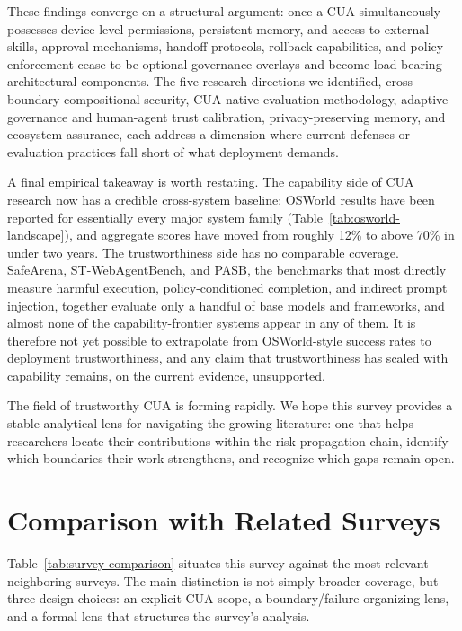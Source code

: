 These findings converge on a structural argument: once a CUA simultaneously possesses device-level permissions, persistent memory, and access to external skills, approval mechanisms, handoff protocols, rollback capabilities, and policy enforcement cease to be optional governance overlays and become load-bearing architectural components. The five research directions we identified, cross-boundary compositional security, CUA-native evaluation methodology, adaptive governance and human-agent trust calibration, privacy-preserving memory, and ecosystem assurance, each address a dimension where current defenses or evaluation practices fall short of what deployment demands.

A final empirical takeaway is worth restating. The capability side of CUA research now has a credible cross-system baseline: OSWorld results have been reported for essentially every major system family (Table~\ref{tab:osworld-landscape}), and aggregate scores have moved from roughly 12\% to above 70\% in under two years. The trustworthiness side has no comparable coverage. SafeArena, ST-WebAgentBench, and PASB, the benchmarks that most directly measure harmful execution, policy-conditioned completion, and indirect prompt injection, together evaluate only a handful of base models and frameworks, and almost none of the capability-frontier systems appear in any of them. It is therefore not yet possible to extrapolate from OSWorld-style success rates to deployment trustworthiness, and any claim that trustworthiness has scaled with capability remains, on the current evidence, unsupported.

The field of trustworthy CUA is forming rapidly. We hope this survey provides a stable analytical lens for navigating the growing literature: one that helps researchers locate their contributions within the risk propagation chain, identify which boundaries their work strengthens, and recognize which gaps remain open.




\clearpage
\appendix

\section{Comparison with Related Surveys}
\label{app:related-surveys}

Table~\ref{tab:survey-comparison} situates this survey against the most relevant neighboring surveys. The main distinction is not simply broader coverage, but three design choices: an explicit CUA scope, a boundary/failure organizing lens, and a formal lens that structures the survey's analysis.

